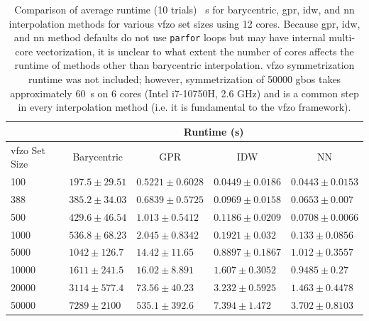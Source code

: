 \documentclass[final,twocolumn,12pt]{elsarticle}
\begin{document}
\begin{table}
\centering
\caption{Comparison of average runtime (\num{10} trials) \SI{}{\second} for barycentric, \gls{gpr}, \gls{idw}, and \gls{nn} interpolation methods for various \gls{vfzo} set sizes using 12 cores. Because \gls{gpr}, \gls{idw}, and \gls{nn} method defaults do not use \texttt{parfor} loops but may have internal multi-core vectorization, it is unclear to what extent the number of cores affects the runtime of methods other than barycentric interpolation. \Gls{vfzo} symmetrization runtime was not included; however, symmetrization of \num{50000} \glspl{gbo} takes approximately \SI{60}{\second} on 6 cores (Intel i7-10750H, 2.6 GHz) and is a common step in every interpolation method (i.e. it is fundamental to the \gls{vfzo} framework).}
\label{tab:runtime}
\begin{tabular}{@{}lllll@{}}
\cmidrule(l){2-5}
            & \multicolumn{4}{c}{Runtime (s)}                                                     \\ \midrule
\gls{vfzo} Set Size & \multicolumn{1}{c}{Barycentric} & \multicolumn{1}{c}{GPR} & \multicolumn{1}{c}{IDW} & \multicolumn{1}{c}{NN} \\ \midrule
\num{100}   & $197.5 \pm 29.51$ & $0.5221 \pm 0.6028$ & $0.0449 \pm 0.0186$ & $0.0443 \pm 0.0153$ \\
\num{388}   & $385.2 \pm 34.03$ & $0.6839 \pm 0.5725$ & $0.0969 \pm 0.0158$ & $0.0653 \pm 0.007$  \\
\num{500}   & $429.6 \pm 46.54$ & $1.013 \pm 0.5412$  & $0.1186 \pm 0.0209$ & $0.0708 \pm 0.0066$ \\
\num{1000}  & $536.8 \pm 68.23$ & $2.045 \pm 0.8342$  & $0.1921 \pm 0.032$  & $0.133 \pm 0.0856$  \\
\num{5000}  & $1042 \pm 126.7$  & $14.42 \pm 11.65$   & $0.8897 \pm 0.1867$ & $1.012 \pm 0.3557$  \\
\num{10000} & $1611 \pm 241.5$  & $16.02 \pm 8.891$   & $1.607 \pm 0.3052$  & $0.9485 \pm 0.27$   \\
\num{20000} & $3114 \pm 577.4$  & $73.56 \pm 40.23$   & $3.232 \pm 0.5925$  & $1.463 \pm 0.4478$  \\
\num{50000} & $7289 \pm 2100$   & $535.1 \pm 392.6$   & $7.394 \pm 1.472$   & $3.702 \pm 0.8103$  \\ \bottomrule
\end{tabular}
\end{table}
\end{document}
